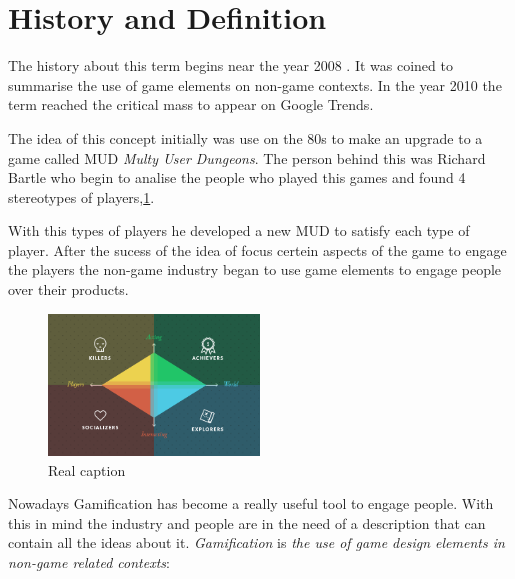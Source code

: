 \section{History and Definition}

The history about this term begins near the year 2008 \cite{DefineGamefication}. 
It was coined to summarise the use of game elements on non-game contexts.
In the year 2010 the term reached the critical mass to appear on Google
Trends\cite{LiCap1.3}.

The idea of this concept initially was use on the 80s to make an upgrade to a 
game called MUD \emph{Multy User Dungeons}. The person behind this was Richard Bartle
who begin to analise the people who played this games and found 4 stereotypes of
players,\ref{fig:Players}.

With this types of players he developed a new MUD to satisfy each type of player.
After the sucess of the idea of focus certein aspects of the game to engage the players
the non-game industry began to use game elements to engage people over their products. 

\begin{figure}[!htb]
  \centering
  \includegraphics[width=0.5\textwidth]{images/TypeOfPlayersBartle.png}
  \caption[Caption for LOF]{Real caption\footnotemark}
  \label{fig:Players}
\end{figure}

 	

Nowadays Gamification has become a really useful tool to engage people. With this in
mind the industry and people are in the need of a description that can contain
all the ideas about it. \emph{Gamification} is \emph{the use of game design elements
in non-game related contexts}:

